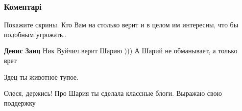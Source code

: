  
 
 
 
 
\subsubsection{Коментарі}

\begin{itemize}
 
Покажите скрины. Кто Вам на столько верит и в целом им интересны, что бы подобным угрожать..

\begin{itemize}
 
\textbf{Денис Заиц} Ник Вуйчич верит Шарию )))
А Шарий не обманывает, а только врет

 
Здец ты животное тупое.
\end{itemize}

 
Олеся, держись! Про Шария ты сделала классные блоги. Выражаю свою поддержку

\begin{itemize}
 

\end{itemize}
\end{itemize}
